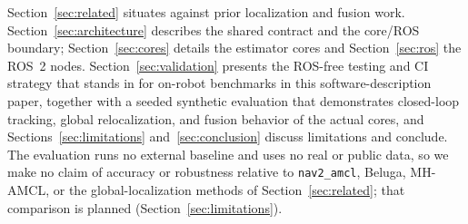 Section~\ref{sec:related} situates \prismloc{} against prior
localization and fusion work. Section~\ref{sec:architecture} describes
the shared contract and the core/ROS boundary; Section~\ref{sec:cores}
details the estimator cores and Section~\ref{sec:ros} the ROS~2 nodes.
Section~\ref{sec:validation} presents the ROS-free testing and CI
strategy that stands in for on-robot benchmarks in this
software-description paper, together with a seeded synthetic evaluation
that demonstrates closed-loop tracking, global relocalization, and
fusion behavior of the actual cores, and
Sections~\ref{sec:limitations} and~\ref{sec:conclusion} discuss
limitations and conclude. The evaluation runs no external baseline and
uses no real or public data, so we make no claim of accuracy or
robustness relative to \texttt{nav2\_amcl}, Beluga, MH-AMCL, or the
global-localization methods of Section~\ref{sec:related}; that
comparison is planned (Section~\ref{sec:limitations}).
